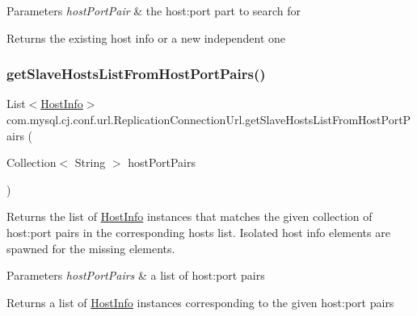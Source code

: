 \begin{DoxyParams}{Parameters}
{\em host\+Port\+Pair} & the host\+:port part to search for \\
\hline
\end{DoxyParams}
\begin{DoxyReturn}{Returns}
the existing host info or a new independent one 
\end{DoxyReturn}
\mbox{\label{classcom_1_1mysql_1_1cj_1_1conf_1_1url_1_1_replication_connection_url_a8298b0962db02256dc6f0e6cbf475d8c}} 
\subsubsection{\texorpdfstring{get\+Slave\+Hosts\+List\+From\+Host\+Port\+Pairs()}{getSlaveHostsListFromHostPortPairs()}}
{\footnotesize\ttfamily List$<$\mbox{\hyperlink{classcom_1_1mysql_1_1cj_1_1conf_1_1_host_info}{Host\+Info}}$>$ com.\+mysql.\+cj.\+conf.\+url.\+Replication\+Connection\+Url.\+get\+Slave\+Hosts\+List\+From\+Host\+Port\+Pairs (\begin{DoxyParamCaption}\item[{Collection$<$ String $>$}]{host\+Port\+Pairs }\end{DoxyParamCaption})}

Returns the list of \mbox{\hyperlink{classcom_1_1mysql_1_1cj_1_1conf_1_1_host_info}{Host\+Info}} instances that matches the given collection of host\+:port pairs in the corresponding hosts list. Isolated host info elements are spawned for the missing elements.


\begin{DoxyParams}{Parameters}
{\em host\+Port\+Pairs} & a list of host\+:port pairs \\
\hline
\end{DoxyParams}
\begin{DoxyReturn}{Returns}
a list of \mbox{\hyperlink{classcom_1_1mysql_1_1cj_1_1conf_1_1_host_info}{Host\+Info}} instances corresponding to the given host\+:port pairs 
\end{DoxyReturn}
\mbox{\label{classcom_1_1mysql_1_1cj_1_1conf_1_1url_1_1_replication_connection_url_ad187e71f456d74a6e9d5533944a10489}} 
